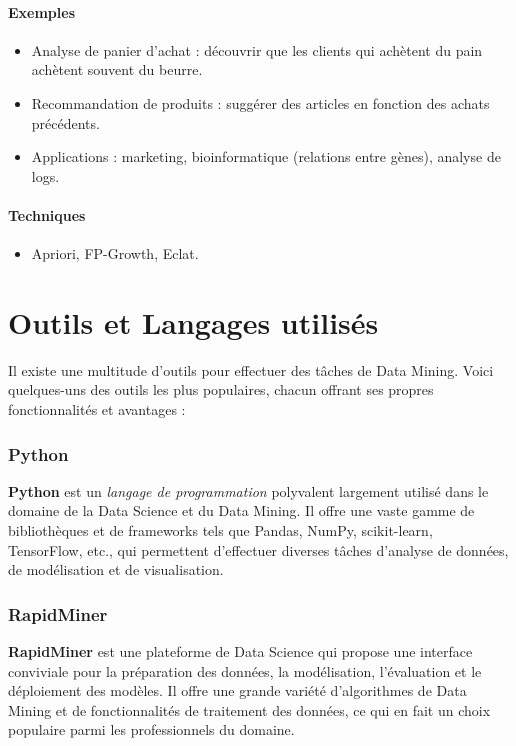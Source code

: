 \documentclass[a4paper,12pt]{report}
\begin{document}
        \subsubsection*{Exemples}
        
        \begin{itemize}
            \item  Analyse de panier d’achat : découvrir que les clients qui achètent du pain achètent souvent du beurre.
            \item  Recommandation de produits : suggérer des articles en fonction des achats précédents.
            \item  Applications : marketing, bioinformatique (relations entre gènes), analyse de logs.
        \end{itemize}
        
        \subsubsection*{Techniques}
        
        \begin{itemize}
            \item Apriori, FP-Growth, Eclat.
        \end{itemize}


\chapter{Outils et Langages utilisés}
Il existe une multitude d’outils pour effectuer des tâches de Data Mining. Voici quelques-uns des outils les plus populaires, chacun offrant ses propres fonctionnalités et avantages :

    \subsection{Python}
    \textbf{Python} est un \emph{langage de programmation} polyvalent largement utilisé dans le domaine de la Data Science et du Data Mining. Il offre une vaste gamme de bibliothèques et de frameworks tels que Pandas, NumPy, scikit-learn, TensorFlow, etc., qui permettent d’effectuer diverses tâches d’analyse de données, de modélisation et de visualisation.

    \subsection{RapidMiner}
    \textbf{RapidMiner} est une plateforme de Data Science qui propose une interface conviviale pour la préparation des données, la modélisation, l’évaluation et le déploiement des modèles. Il offre une grande variété d’algorithmes de Data Mining et de fonctionnalités de traitement des données, ce qui en fait un choix populaire parmi les professionnels du domaine.
\end{document}

